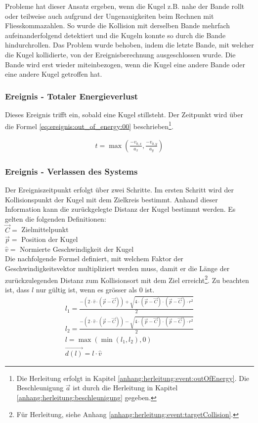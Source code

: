 Probleme hat dieser Ansatz ergeben, wenn die Kugel z.B. nahe der Bande rollt oder teilweise auch aufgrund der Ungenauigkeiten
beim Rechnen mit Fliesskommazahlen. So wurde die Kollision mit derselben Bande mehrfach aufeinanderfolgend detektiert und
die Kugeln konnte so durch die Bande hindurchrollen. Das Problem wurde behoben, indem
die letzte Bande, mit welcher die Kugel kollidierte, von der Ereignisberechnung ausgeschlossen wurde. Die Bande wird
erst wieder miteinbezogen, wenn die Kugel eine andere Bande oder eine andere Kugel getroffen hat.

\subsubsection{Ereignis - Totaler Energieverlust}
Dieses Ereignis trifft ein, sobald eine Kugel stillsteht. Der Zeitpunkt wird über die Formel \ref{eq:ereignis:out_of_energy:00}
beschrieben\footnote{Die Herleitung erfolgt in Kapitel \ref{anhang:herleitung:event:outOfEnergy}.
Die Beschleunigung $\vec{a}$ ist durch die Herleitung in Kapitel \ref{anhang:herleitung:beschleunigung}
gegeben.}.

\begin{align}
    t = \max{(\frac{-v_{0,x}}{a_x}, \frac{-v_{0,y}}{a_y})}\label{eq:ereignis:out_of_energy:00}
\end{align}

\subsubsection{Ereignis - Verlassen des Systems}
Der Ereigniszeitpunkt erfolgt über zwei Schritte. Im ersten Schritt wird der Kollisionspunkt der Kugel mit dem
Zielkreis bestimmt. Anhand dieser Information kann die zurückgelegte Distanz der Kugel bestimmt werden.
Es gelten die folgenden Definitionen:\\
$\vec{C} = $ Zielmittelpunkt\\
$\vec{p} = $ Position der Kugel\\
$\hat{v} = $ Normierte Geschwindigkeit der Kugel\\

Die nachfolgende Formel definiert, mit welchem Faktor der Geschwindigkeitsvektor multipliziert werden muss, damit
er die Länge der zurückzulegenden Distanz zum Kollisionsort mit dem Ziel erreicht\footnote{
Für Herleitung, siehe Anhang \ref{anhang:herleitung:event:targetCollision}.}. Zu beachten ist, dass $l$ nur gültig ist,
wenn es grösser als $0$ ist.
\begin{align}
    l_1 = \frac{-(2 \cdot \hat{v} \cdot (\vec{p} - \vec{C})) + \sqrt{4 \cdot (\vec{p} - \vec{C}) \cdot (\vec{p} - \vec{C}) \cdot r^2}}{2}\\
    l_2 = \frac{-(2 \cdot \hat{v} \cdot (\vec{p} - \vec{C})) - \sqrt{4 \cdot (\vec{p} - \vec{C}) \cdot (\vec{p} - \vec{C}) \cdot r^2}}{2}\\
    l = \max{(\min{(l_1, l_2)}, 0)}\\
    \vec{d(l)} = l \cdot \hat{v}
\end{align}

